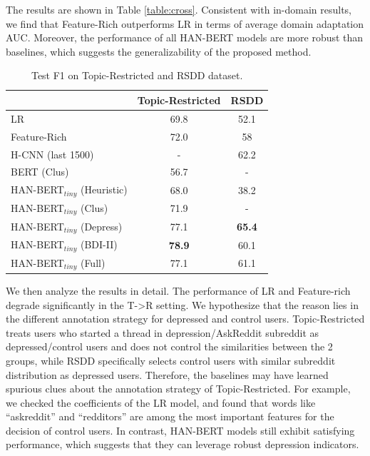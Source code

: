 The results are shown in Table \ref{table:cross}. Consistent with in-domain results, we find that Feature-Rich outperforms LR in terms of average domain adaptation AUC. Moreover, the performance of all HAN-BERT models are more robust than baselines, which suggests the generalizability of the proposed method.

\begin{table}[t]
    \centering
    \small
    \begin{tabular}{l|cc}
        \hline
        {} & Topic-Restricted & RSDD \\
        \hline
        LR & 69.8 & 52.1 \\
        Feature-Rich & 72.0 & 58 \\
        \hline
        H-CNN (last 1500) & - & 62.2 \\
        BERT (Clus) & 56.7 & - \\
        HAN-BERT$_{tiny}$ (Heuristic) & 68.0 & 38.2 \\
        HAN-BERT$_{tiny}$ (Clus) & 71.9 & - \\
        \hline
        HAN-BERT$_{tiny}$ (Depress) & 77.1 & \textbf{65.4} \\
        HAN-BERT$_{tiny}$ (BDI-II) & \textbf{78.9} & 60.1 \\
        HAN-BERT$_{tiny}$ (Full) & 77.1 & 61.1 \\
        \hline
    \end{tabular}
    \caption{\label{table:rsdd_wolohan} Test F1 on Topic-Restricted and RSDD dataset.}
\end{table}

We then analyze the results in detail. The performance of LR and Feature-rich degrade significantly in the T->R setting. We hypothesize that the reason lies in the different annotation strategy for depressed and control users. Topic-Restricted treats users who started a thread in depression/AskReddit subreddit as depressed/control users and does not control the similarities between the 2 groups, while RSDD specifically selects control users with similar subreddit distribution as depressed users. Therefore, the baselines may have learned spurious clues about the annotation strategy of Topic-Restricted. For example, we checked the coefficients of the LR model, and found that words like ``askreddit'' and ``redditors'' are among the most important features for the decision of control users. In contrast, HAN-BERT models still exhibit satisfying performance, which suggests that they can leverage robust depression indicators. 

